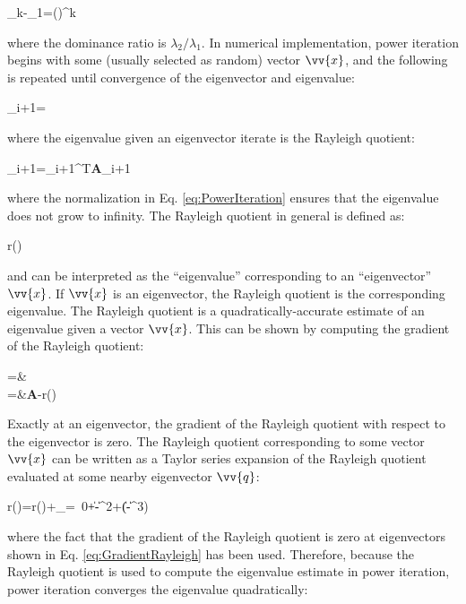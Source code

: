 \beq
\left\Vert{}_k-\pm{}_1\right\Vert=\left\lbrack\left(\right)^k\right\rbrack
\eeq

where the dominance ratio is \(\lambda_2/\lambda_1\). In numerical implementation, power iteration begins with some (usually selected as random) vector \(\vv{x}\), and the following is repeated until convergence of the eigenvector and eigenvalue:

\beqa
\label{eq:PowerIteration}
_{i+1}=
\eeqa

where the eigenvalue given an eigenvector iterate is the Rayleigh quotient:

\beq
\lambda_{i+1}=_{i+1}^T\textbf{A}_{i+1}
\eeq

where the normalization in Eq. \eqref{eq:PowerIteration} ensures that the eigenvalue does not grow to infinity. The Rayleigh quotient in general is defined as:

\beq
r()\equiv{}
\eeq

and can be interpreted as the ``eigenvalue'' corresponding to an ``eigenvector'' \(\vv{x}\). If \(\vv{x}\) is an eigenvector, the Rayleigh quotient is the corresponding eigenvalue. The Rayleigh quotient is a quadratically-accurate estimate of an eigenvalue given a vector \(\vv{x}\). This can be shown by computing the gradient of the Rayleigh quotient:

\beqa
\label{eq:GradientRayleigh}
=&\\
=&\left\lbrack\textbf{A}-r()\right\rbrack\hspace{2cm}
\eeqa

Exactly at an eigenvector, the gradient of the Rayleigh quotient with respect to the eigenvector is zero. The Rayleigh quotient corresponding to some vector \(\vv{x}\) can be written as a Taylor series expansion of the Rayleigh quotient evaluated at some nearby eigenvector \(\vv{q}\):

\beq
r()=r()+_{=\ 0}+\|-\|^2+\left(\|-\|^3\right)
\eeq

where the fact that the gradient of the Rayleigh quotient is zero at eigenvectors shown in Eq. \eqref{eq:GradientRayleigh} has been used. Therefore, because the Rayleigh quotient is used to compute the eigenvalue estimate in power iteration, power iteration converges the eigenvalue quadratically:


